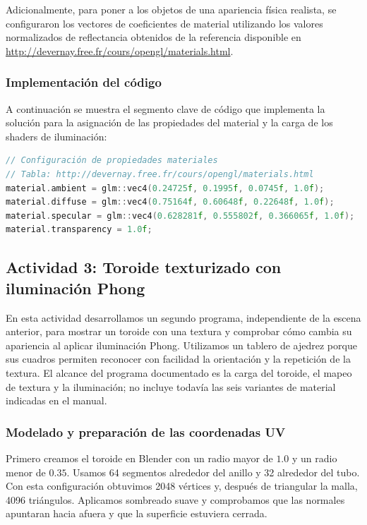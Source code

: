 Adicionalmente, para poner a los objetos de una apariencia física realista, se configuraron los vectores de coeficientes de material utilizando los valores normalizados de reflectancia obtenidos de la referencia disponible en \url{http://devernay.free.fr/cours/opengl/materials.html}.

\subsubsection{Implementación del código}
A continuación se muestra el segmento clave de código que implementa la solución para la asignación de las propiedades del material y la carga de los shaders de iluminación:

\begin{lstlisting}[language=C++, caption={Configuración de propiedades materiales y renderizado del objeto.}]
// Configuración de propiedades materiales
// Tabla: http://devernay.free.fr/cours/opengl/materials.html
material.ambient = glm::vec4(0.24725f, 0.1995f, 0.0745f, 1.0f);
material.diffuse = glm::vec4(0.75164f, 0.60648f, 0.22648f, 1.0f);
material.specular = glm::vec4(0.628281f, 0.555802f, 0.366065f, 1.0f);
material.transparency = 1.0f;
\end{lstlisting}

\subsection{Actividad 3: Toroide texturizado con iluminación Phong}
\label{sec:act3_metodologia}

En esta actividad desarrollamos un segundo programa, independiente de la escena anterior, para mostrar un toroide con una textura y comprobar cómo cambia su apariencia al aplicar iluminación Phong. Utilizamos un tablero de ajedrez porque sus cuadros permiten reconocer con facilidad la orientación y la repetición de la textura. El alcance del programa documentado es la carga del toroide, el mapeo de textura y la iluminación; no incluye todavía las seis variantes de material indicadas en el manual.

\subsubsection{Modelado y preparación de las coordenadas UV}

Primero creamos el toroide en Blender con un radio mayor de $1.0$ y un radio menor de $0.35$. Usamos 64 segmentos alrededor del anillo y 32 alrededor del tubo. Con esta configuración obtuvimos 2048 vértices y, después de triangular la malla, 4096 triángulos. Aplicamos sombreado suave y comprobamos que las normales apuntaran hacia afuera y que la superficie estuviera cerrada.

